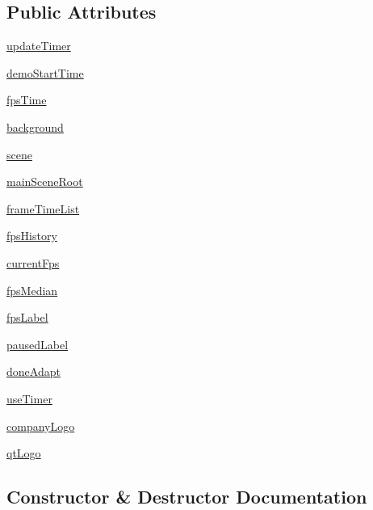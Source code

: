 \subsection*{Public Attributes}
\begin{DoxyCompactItemize}
\item 
\hyperlink{classmainwindow_1_1MainWindow_af36f7ce50ea8e1aed9e505396d55b6e9}{update\+Timer}
\item 
\hyperlink{classmainwindow_1_1MainWindow_a2260d68ce4e2bde093f24a688e9eba87}{demo\+Start\+Time}
\item 
\hyperlink{classmainwindow_1_1MainWindow_a314af59f97b77df1a9263ed2fb24cc55}{fps\+Time}
\item 
\hyperlink{classmainwindow_1_1MainWindow_ac6adcba63d4e0887a9fb4c26ca98c82b}{background}
\item 
\hyperlink{classmainwindow_1_1MainWindow_a985550debdfc036ec91de01ca14e90c9}{scene}
\item 
\hyperlink{classmainwindow_1_1MainWindow_a0a62c4941147272a07bb477806e2e8c2}{main\+Scene\+Root}
\item 
\hyperlink{classmainwindow_1_1MainWindow_a5222ad41e85f38b8c6d28f5155c04b17}{frame\+Time\+List}
\item 
\hyperlink{classmainwindow_1_1MainWindow_ad896db32b6f7e41f8c2f073ec183f1b8}{fps\+History}
\item 
\hyperlink{classmainwindow_1_1MainWindow_a4df50fd083289d3ce4829fd0b35f4c8b}{current\+Fps}
\item 
\hyperlink{classmainwindow_1_1MainWindow_ae860270641bcf67d151fe1187152cd72}{fps\+Median}
\item 
\hyperlink{classmainwindow_1_1MainWindow_ac16ff26cae7d3b965acd171b65e0971b}{fps\+Label}
\item 
\hyperlink{classmainwindow_1_1MainWindow_a138ee205631bda5f8a2008835bcb75fa}{paused\+Label}
\item 
\hyperlink{classmainwindow_1_1MainWindow_a6be055c3dd6f5a96fb3bf22fdf4b9b98}{done\+Adapt}
\item 
\hyperlink{classmainwindow_1_1MainWindow_afda2a20b50793e3586b0dfe6a27c702e}{use\+Timer}
\item 
\hyperlink{classmainwindow_1_1MainWindow_a017a4b72eb087fe593fa5afe0079b812}{company\+Logo}
\item 
\hyperlink{classmainwindow_1_1MainWindow_a46c7524a88b58f336e311137a041159d}{qt\+Logo}
\end{DoxyCompactItemize}


\subsection{Constructor \& Destructor Documentation}
\hypertarget{classmainwindow_1_1MainWindow_a35715d29ce0d912bcb4492a8f365042a}{}

